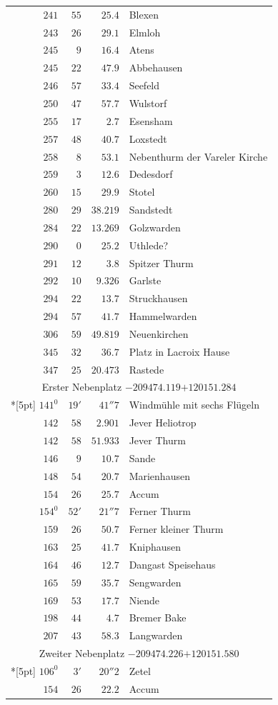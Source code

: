 \begin{longtable}{@{}rrrp{.61\linewidth}@{}}
\(241\)&\(55\)&\(25.4\)&\raggedright Blexen\tabularnewline
\(243\)&\(26\)&\(29.1\)&\raggedright Elmloh\tabularnewline
\(245\)&\(9\)&\(16.4\)&\raggedright Atens\tabularnewline
\(245\)&\(22\)&\(47.9\)&\raggedright Abbehausen\tabularnewline
\(246\)&\(57\)&\(33.4\)&\raggedright Seefeld\tabularnewline
\(250\)&\(47\)&\(57.7\)&\raggedright Wulstorf\tabularnewline
\(255\)&\(17\)&\(2.7\)&\raggedright Esensham\tabularnewline
\(257\)&\(48\)&\(40.7\)&\raggedright Loxstedt\tabularnewline
\(258\)&\(8\)&\(53.1\)&\raggedright Nebenthurm der Vareler Kirche\tabularnewline
\(259\)&\(3\)&\(12.6\)&\raggedright Dedesdorf\tabularnewline
\(260\)&\(15\)&\(29.9\)&\raggedright Stotel\tabularnewline
\(280\)&\(29\)&\(38.219\)&\raggedright Sandstedt\tabularnewline
\(284\)&\(22\)&\(13.269\)&\raggedright Golzwarden\tabularnewline
\(290\)&\(0\)&\(25.2\)&\raggedright Uthlede?\tabularnewline
\(291\)&\(12\)&\(3.8\)&\raggedright Spitzer Thurm\tabularnewline
\(292\)&\(10\)&\(9.326\)&\raggedright Garlste\tabularnewline
\(294\)&\(22\)&\(13.7\)&\raggedright Struckhausen\tabularnewline
\(294\)&\(57\)&\(41.7\)&\raggedright Hammelwarden\tabularnewline
\(306\)&\(59\)&\(49.819\)&\raggedright Neuenkirchen\tabularnewline
\(345\)&\(32\)&\(36.7\)&\raggedright Platz in Lacroix Hause\tabularnewline
\(347\)&\(25\)&\(20.473\)&\raggedright Rastede\tabularnewline
\multicolumn{4}{c}{Erster Nebenplatz \(-209474.119\)\qquad\(+120151.284\)}\\*[5pt]
\(141^{0}\)&\(19'\)&\(41''7\)&\raggedright Windmühle mit sechs Flügeln\tabularnewline
\(142\)&\(58\)&\(2.901\)&\raggedright Jever Heliotrop\tabularnewline
\(142\)&\(58\)&\(51.933\)&\raggedright Jever Thurm\tabularnewline
\(146\)&\(9\)&\(10.7\)&\raggedright Sande\tabularnewline
\(148\)&\(54\)&\(20.7\)&\raggedright Marienhausen\tabularnewline
\(154\)&\(26\)&\(25.7\)&\raggedright Accum\tabularnewline
\(154^{0}\)&\(52'\)&\(21''7\)&\raggedright Ferner Thurm\tabularnewline
\(159\)&\(26\)&\(50.7\)&\raggedright Ferner kleiner Thurm\tabularnewline
\(163\)&\(25\)&\(41.7\)&\raggedright Kniphausen\tabularnewline
\(164\)&\(46\)&\(12.7\)&\raggedright Dangast Speisehaus\tabularnewline
\(165\)&\(59\)&\(35.7\)&\raggedright Sengwarden\tabularnewline
\(169\)&\(53\)&\(17.7\)&\raggedright Niende\tabularnewline
\(198\)&\(44\)&\(4.7\)&\raggedright Bremer Bake\tabularnewline
\(207\)&\(43\)&\(58.3\)&\raggedright Langwarden\tabularnewline
\multicolumn{4}{c}{Zweiter Nebenplatz \(-209474.226\)\qquad\(+120151.580\)}\\*[5pt]
\(106^{0}\)&\(3'\)&\(20''2\)&\raggedright Zetel\tabularnewline
\(154\)&\(26\)&\(22.2\)&\raggedright Accum\tabularnewline

\end{longtable}
